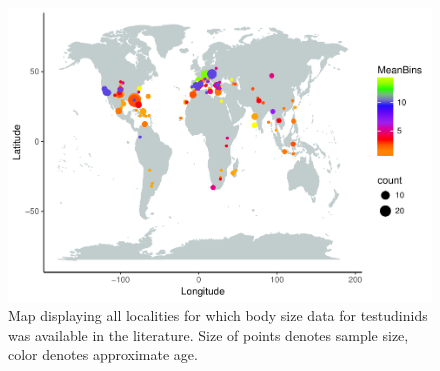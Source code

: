 \documentclass[]{article}
\begin{document}
\begin{figure}[htbp]
\centering
\includegraphics{MA_JJ_files/figure-latex/MapCL-1.pdf}
\caption{Map displaying all localities for which body size data for
testudinids was available in the literature. Size of points denotes
sample size, color denotes approximate age.}
\end{figure}
\end{document}
